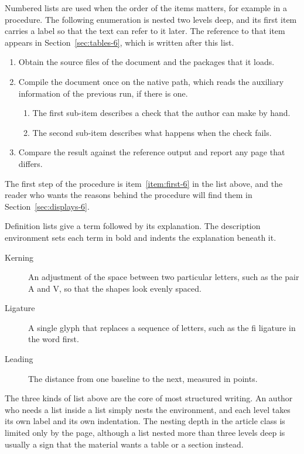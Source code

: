 \documentclass{article}
\begin{document}
Numbered lists are used when the order of the items matters, for example in a
procedure. The following enumeration is nested two levels deep, and its first item
carries a label so that the text can refer to it later. The reference to that item
appears in Section~\ref{sec:tables-6}, which is written after this list.

\begin{enumerate}
  \item\label{item:first-6} Obtain the source files of the document and the packages that
        it loads.
  \item Compile the document once on the native path, which reads the auxiliary
        information of the previous run, if there is one.
        \begin{enumerate}
          \item The first sub-item describes a check that the author can make by hand.
          \item The second sub-item describes what happens when the check fails.
        \end{enumerate}
  \item Compare the result against the reference output and report any page that
        differs.
\end{enumerate}

The first step of the procedure is item~\ref{item:first-6} in the list above, and the
reader who wants the reasons behind the procedure will find them in
Section~\ref{sec:displays-6}.

Definition lists give a term followed by its explanation. The description environment
sets each term in bold and indents the explanation beneath it.

\begin{description}
  \item[Kerning] An adjustment of the space between two particular letters, such as
        the pair A and V, so that the shapes look evenly spaced.
  \item[Ligature] A single glyph that replaces a sequence of letters, such as the
        fi ligature in the word first.
  \item[Leading] The distance from one baseline to the next, measured in points.
\end{description}

The three kinds of list above are the core of most structured writing. An author who
needs a list inside a list simply nests the environment, and each level takes its own
label and its own indentation. The nesting depth in the article class is limited only
by the page, although a list nested more than three levels deep is usually a sign that
the material wants a table or a section instead.
\end{document}
